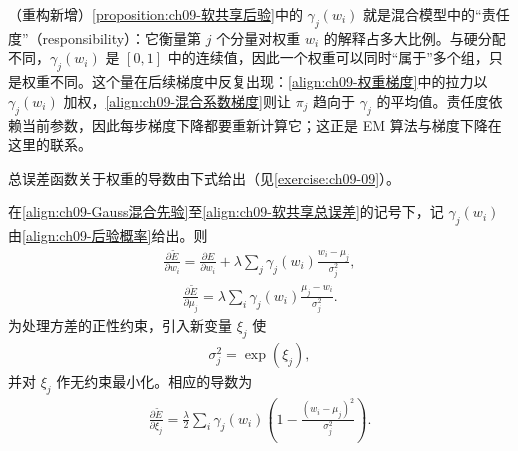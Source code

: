 \documentclass[../../main.tex]{subfiles}
\begin{document}
\begin{remark}（重构新增）\cref{proposition:ch09-软共享后验}中的 $\gamma_{j}(w_{i})$ 就是混合模型中的“责任度”（responsibility）：它衡量第 $j$ 个分量对权重 $w_{i}$ 的解释占多大比例。与硬分配不同，$\gamma_{j}(w_{i})$ 是 $[0,1]$ 中的连续值，因此一个权重可以同时“属于”多个组，只是权重不同。这个量在后续梯度中反复出现：\eqref{align:ch09-权重梯度}中的拉力以 $\gamma_{j}(w_{i})$ 加权，\eqref{align:ch09-混合系数梯度}则让 $\pi_{j}$ 趋向于 $\gamma_{j}$ 的平均值。责任度依赖当前参数，因此每步梯度下降都要重新计算它；这正是 EM 算法与梯度下降在这里的联系。
\end{remark}

总误差函数关于权重的导数由下式给出（见\cref{exercise:ch09-09}）。

\begin{proposition}[软权重共享的梯度]\label{proposition:ch09-软共享梯度}
在\eqref{align:ch09-Gauss混合先验}至\eqref{align:ch09-软共享总误差}的记号下，记 $\gamma_{j}(w_{i})$ 由\eqref{align:ch09-后验概率}给出。则
\begin{align}
\frac{\partial\widetilde{E}}{\partial w_{i}}=\frac{\partial E}{\partial w_{i}}+\lambda\sum_{j}\gamma_{j}(w_{i})\frac{w_{i}-\mu_{j}}{\sigma_{j}^{2}},
\label{align:ch09-权重梯度}
\end{align}
\begin{align}
\frac{\partial\widetilde{E}}{\partial\mu_{j}}=\lambda\sum_{i}\gamma_{j}(w_{i})\frac{\mu_{j}-w_{i}}{\sigma_{j}^{2}}.
\label{align:ch09-均值梯度}
\end{align}
为处理方差的正性约束，引入新变量 $\xi_{j}$ 使
\begin{align}
\sigma_{j}^{2}=\exp(\xi_{j}),
\label{align:ch09-方差参数化}
\end{align}
并对 $\xi_{j}$ 作无约束最小化。相应的导数为
\begin{align}
\frac{\partial\widetilde{E}}{\partial\xi_{j}}=\frac{\lambda}{2}\sum_{i}\gamma_{j}(w_{i})\left(1-\frac{(w_{i}-\mu_{j})^{2}}{\sigma_{j}^{2}}\right).
\label{align:ch09-方差参数梯度}
\end{align}
\end{proposition}
\end{document}
